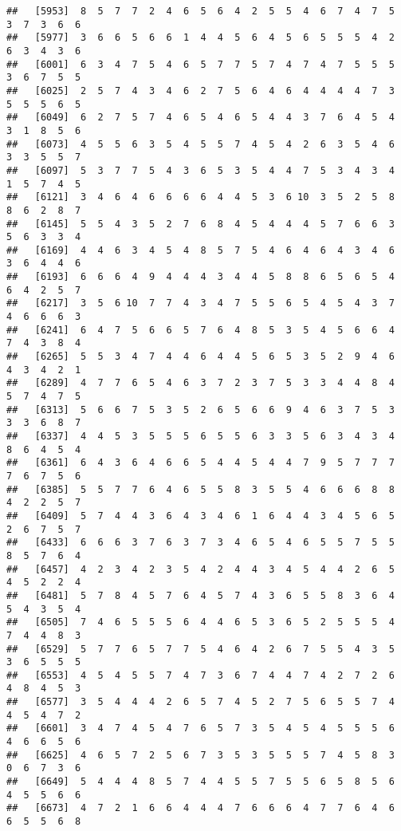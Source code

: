 \documentclass[
]{book}
\begin{document}
\begin{verbatim}
##   [5953]  8  5  7  7  2  4  6  5  6  4  2  5  5  4  6  7  4  7  5  3  7  3  6  6
##   [5977]  3  6  6  5  6  6  1  4  4  5  6  4  5  6  5  5  5  4  2  6  3  4  3  6
##   [6001]  6  3  4  7  5  4  6  5  7  7  5  7  4  7  4  7  5  5  5  3  6  7  5  5
##   [6025]  2  5  7  4  3  4  6  2  7  5  6  4  6  4  4  4  4  7  3  5  5  5  6  5
##   [6049]  6  2  7  5  7  4  6  5  4  6  5  4  4  3  7  6  4  5  4  3  1  8  5  6
##   [6073]  4  5  5  6  3  5  4  5  5  7  4  5  4  2  6  3  5  4  6  3  3  5  5  7
##   [6097]  5  3  7  7  5  4  3  6  5  3  5  4  4  7  5  3  4  3  4  1  5  7  4  5
##   [6121]  3  4  6  4  6  6  6  6  4  4  5  3  6 10  3  5  2  5  8  8  6  2  8  7
##   [6145]  5  5  4  3  5  2  7  6  8  4  5  4  4  4  5  7  6  6  3  5  6  3  3  4
##   [6169]  4  4  6  3  4  5  4  8  5  7  5  4  6  4  6  4  3  4  6  3  6  4  4  6
##   [6193]  6  6  6  4  9  4  4  4  3  4  4  5  8  8  6  5  6  5  4  6  4  2  5  7
##   [6217]  3  5  6 10  7  7  4  3  4  7  5  5  6  5  4  5  4  3  7  4  6  6  6  3
##   [6241]  6  4  7  5  6  6  5  7  6  4  8  5  3  5  4  5  6  6  4  7  4  3  8  4
##   [6265]  5  5  3  4  7  4  4  6  4  4  5  6  5  3  5  2  9  4  6  4  3  4  2  1
##   [6289]  4  7  7  6  5  4  6  3  7  2  3  7  5  3  3  4  4  8  4  5  7  4  7  5
##   [6313]  5  6  6  7  5  3  5  2  6  5  6  6  9  4  6  3  7  5  3  3  3  6  8  7
##   [6337]  4  4  5  3  5  5  5  6  5  5  6  3  3  5  6  3  4  3  4  8  6  4  5  4
##   [6361]  6  4  3  6  4  6  6  5  4  4  5  4  4  7  9  5  7  7  7  7  6  7  5  6
##   [6385]  5  5  7  7  6  4  6  5  5  8  3  5  5  4  6  6  6  8  8  4  2  2  5  7
##   [6409]  5  7  4  4  3  6  4  3  4  6  1  6  4  4  3  4  5  6  5  2  6  7  5  7
##   [6433]  6  6  6  3  7  6  3  7  3  4  6  5  4  6  5  5  7  5  5  8  5  7  6  4
##   [6457]  4  2  3  4  2  3  5  4  2  4  4  3  4  5  4  4  2  6  5  4  5  2  2  4
##   [6481]  5  7  8  4  5  7  6  4  5  7  4  3  6  5  5  8  3  6  4  5  4  3  5  4
##   [6505]  7  4  6  5  5  5  6  4  4  6  5  3  6  5  2  5  5  5  4  7  4  4  8  3
##   [6529]  5  7  7  6  5  7  7  5  4  6  4  2  6  7  5  5  4  3  5  3  6  5  5  5
##   [6553]  4  5  4  5  5  7  4  7  3  6  7  4  4  7  4  2  7  2  6  4  8  4  5  3
##   [6577]  3  5  4  4  4  2  6  5  7  4  5  2  7  5  6  5  5  7  4  4  5  4  7  2
##   [6601]  3  4  7  4  5  4  7  6  5  7  3  5  4  5  4  5  5  5  6  4  6  6  5  6
##   [6625]  4  6  5  7  2  5  6  7  3  5  3  5  5  5  7  4  5  8  3  0  6  7  3  6
##   [6649]  5  4  4  4  8  5  7  4  4  5  5  7  5  5  6  5  8  5  6  4  5  5  6  6
##   [6673]  4  7  2  1  6  6  4  4  4  7  6  6  6  4  7  7  6  4  6  6  5  5  6  8

\end{verbatim}
\end{document}
